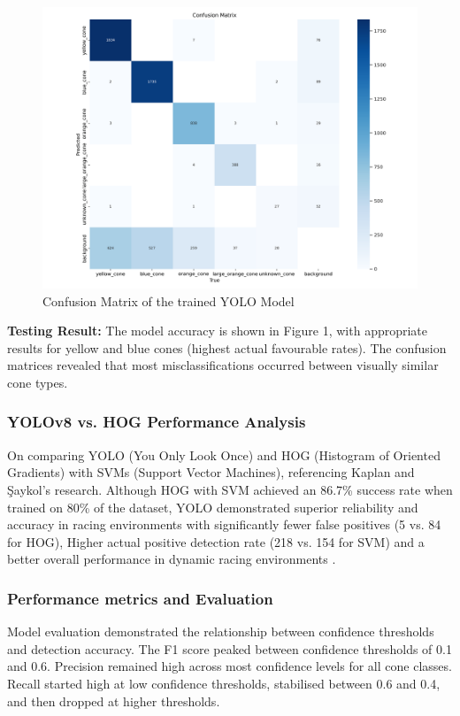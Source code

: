 \documentclass[conference]{IEEEtran}
\begin{document}
\begin{figure}[htbp]
\centerline{\includegraphics[scale=0.3]{images/confusion_matrix.png}}
\caption{Confusion Matrix of the trained YOLO Model}
\label{fig}
\end{figure}

\textbf{Testing Result:} The model accuracy is shown in Figure 1, with appropriate results for yellow and blue cones (highest actual favourable rates). The confusion matrices revealed that most misclassifications occurred between visually similar cone types.

\subsubsection{YOLOv8 vs. HOG Performance Analysis}
On comparing YOLO (You Only Look Once) and HOG (Histogram of Oriented Gradients) with SVMs (Support Vector Machines), referencing Kaplan and Şaykol's research. Although HOG with SVM achieved an 86.7\% success rate when trained on 80\% of the dataset, YOLO demonstrated superior reliability and accuracy in racing environments with significantly fewer false positives (5 vs. 84 for HOG), Higher actual positive detection rate (218 vs. 154 for SVM) and a better overall performance in dynamic racing environments \cite{b13}.

\subsubsection{Performance metrics and Evaluation}
Model evaluation demonstrated the relationship between confidence thresholds and detection accuracy. The F1 score peaked between confidence thresholds of 0.1 and 0.6. Precision remained high across most confidence levels for all cone classes. Recall started high at low confidence thresholds, stabilised between 0.6 and 0.4, and then dropped at higher thresholds.
\end{document}

